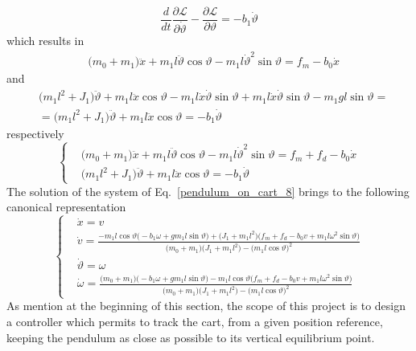 \documentclass[12pt,a4paper,oneside]{book}
\begin{document}
\begin{onehalfspace}
\begin{equation}\label{}
	\frac{d}{dt}\frac{\partial \mathcal{L}}{\partial \dot{\vartheta}} - 
	\frac{\partial \mathcal{L}}{\partial \vartheta} = -b_1\dot{\vartheta}
\end{equation}
which results in
\begin{equation}\label{pendulum_on_cart_6}
	\begin{aligned}
		&\Big(m_0+m_1\Big)\ddot{x}+m_1l\ddot{\vartheta}\cos\vartheta - 
		m_1l\dot{\vartheta}^2\sin\vartheta= f_m-b_0\dot{x}
	\end{aligned}
\end{equation}
and 
\begin{equation}\label{pendulum_on_cart_7}
	\begin{aligned}
		&\Big(m_1l^2+J_1\Big)\ddot{\vartheta}+m_1l\ddot{x}\cos\vartheta- 
		m_1l\dot{x}\dot{\vartheta}\sin\vartheta + 
		m_1l\dot{x}\dot{\vartheta}\sin\vartheta
		-m_1gl\sin\vartheta = \\[6pt]
		&=\Big(m_1l^2+J_1\Big)\ddot{\vartheta}+m_1l\ddot{x}\cos\vartheta=-b_1\dot{\vartheta}
	\end{aligned}
\end{equation}
respectively 
\begin{equation}\label{pendulum_on_cart_8}
	\left\lbrace 	\begin{aligned}
		&\Big(m_0+m_1\Big)\ddot{x}+m_1l\ddot{\vartheta}\cos\vartheta - 
		m_1l\dot{\vartheta}^2\sin\vartheta=f_m+f_d -b_0\dot{x} \\[6pt]
		&\Big(m_1l^2+J_1\Big)\ddot{\vartheta}+m_1l\ddot{x}\cos\vartheta=-b_1\dot{\vartheta}
	\end{aligned}\right. 
\end{equation}
The solution of the system of Eq.~\eqref{pendulum_on_cart_8} brings to the 
following canonical representation
\begin{equation}\label{pendulum_on_cart_9}
	\left\lbrace 	\begin{aligned}
		&\dot{x}=v \\[6pt]
		&\dot{v}=\frac{-m_1l\cos\vartheta 
			\big(-b_1\omega+gm_1l\sin\vartheta\big) + \big(J_1+m_1l^2\big) 
			\big(f_m+f_d-b_0v+m_1l\omega^2 \sin\vartheta\big)}{\big(m_0+m_1\big) 
			\big(J_1+m_1l^2\big) -\big(m_1l\cos\vartheta\big)^2}\\[6pt]
		&\dot{\vartheta}=\omega\\[6pt]
		&\dot{\omega}=\frac{\big(m_0+m_1\big) \big(-b_1\omega + 
			gm_1l\sin\vartheta\big) -m_1l\cos\vartheta \big(f_m+f_d-b_0v+m_1l\omega^2 
			\sin\vartheta\big) }{\big(m_0+m_1\big)
			\big(J_1+m_1l^2\big) - \big(m_1l\cos\vartheta\big)^2}
	\end{aligned}\right. 
\end{equation}
As mention at the beginning of this section, the scope of this project is to design a controller which permits to track the cart, from a given position reference, keeping the pendulum as close as possible to its vertical equilibrium point. 


\end{onehalfspace}
\end{document}
